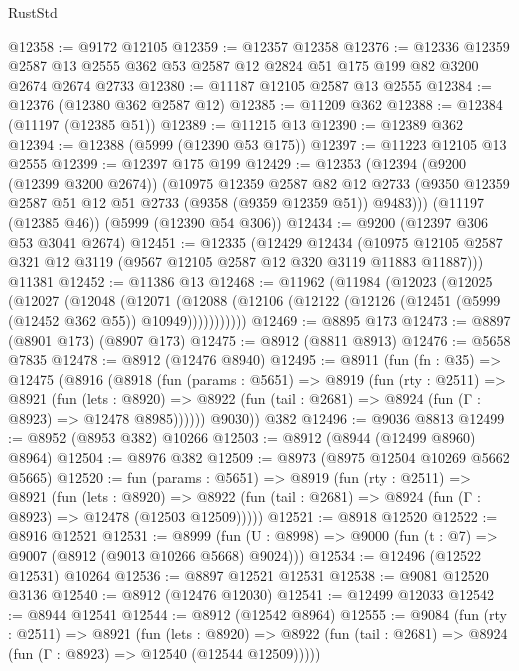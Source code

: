 \begin{lexlean}{RustStd}
\begin{coremodule}
@12358 := @9172 @12105
@12359 := @12357 @12358
@12376 := @12336
    @12359
    @2587
    @13
    @2555
    @362
    @53
    @2587
    @12
    @2824
    @51
    @175
    @199
    @82
    @3200
    @2674
    @2674
    @2733
@12380 := @11187 @12105 @2587 @13 @2555
@12384 := @12376 (@12380 @362 @2587 @12)
@12385 := @11209 @362
@12388 := @12384 (@11197 (@12385 @51))
@12389 := @11215 @13
@12390 := @12389 @362
@12394 := @12388 (@5999 (@12390 @53 @175))
@12397 := @11223 @12105 @13 @2555
@12399 := @12397 @175 @199
@12429 := @12353
    (@12394
      (@9200 (@12399 @3200 @2674))
      (@10975
        @12359
        @2587
        @82
        @12
        @2733
        (@9350 @12359 @2587 @51 @12 @51 @2733 (@9358 (@9359 @12359 @51)) @9483)))
    (@11197 (@12385 @46))
    (@5999 (@12390 @54 @306))
@12434 := @9200 (@12397 @306 @53 @3041 @2674)
@12451 := @12335
    (@12429
      @12434
      (@10975 @12105 @2587 @321 @12 @3119 (@9567 @12105 @2587 @12 @320 @3119 @11883 @11887)))
    @11381
@12452 := @11386 @13
@12468 := @11962
    (@11984
      (@12023
        (@12025
          (@12027
            (@12048
              (@12071
                (@12088 (@12106 (@12122 (@12126 (@12451 (@5999 (@12452 @362 @55)) @10949)))))))))))
@12469 := @8895 @173
@12473 := @8897 (@8901 @173) (@8907 @173)
@12475 := @8912 (@8811 @8913)
@12476 := @5658 @7835
@12478 := @8912 (@12476 @8940)
@12495 := @8911
    (fun (fn : @35) =>
    @12475
      (@8916
        (@8918
          (fun (params : @5651) =>
          @8919
            (fun (rty : @2511) =>
            @8921
              (fun (lets : @8920) =>
              @8922 (fun (tail : @2681) => @8924 (fun (Γ : @8923) => @12478 @8985))))))
        @9030))
    @382
@12496 := @9036 @8813
@12499 := @8952 (@8953 @382) @10266
@12503 := @8912 (@8944 (@12499 @8960) @8964)
@12504 := @8976 @382
@12509 := @8973 (@8975 @12504 @10269 @5662 @5665)
@12520 := fun (params : @5651) =>
  @8919
    (fun (rty : @2511) =>
    @8921
      (fun (lets : @8920) =>
      @8922 (fun (tail : @2681) => @8924 (fun (Γ : @8923) => @12478 (@12503 @12509)))))
@12521 := @8918 @12520
@12522 := @8916 @12521
@12531 := @8999
    (fun (U : @8998) => @9000 (fun (t : @7) => @9007 (@8912 (@9013 @10266 @5668) @9024)))
@12534 := @12496 (@12522 @12531) @10264
@12536 := @8897 @12521 @12531
@12538 := @9081 @12520 @3136
@12540 := @8912 (@12476 @12030)
@12541 := @12499 @12033
@12542 := @8944 @12541
@12544 := @8912 (@12542 @8964)
@12555 := @9084
    (fun (rty : @2511) =>
    @8921
      (fun (lets : @8920) =>
      @8922 (fun (tail : @2681) => @8924 (fun (Γ : @8923) => @12540 (@12544 @12509)))))

\end{coremodule}
\end{lexlean}
